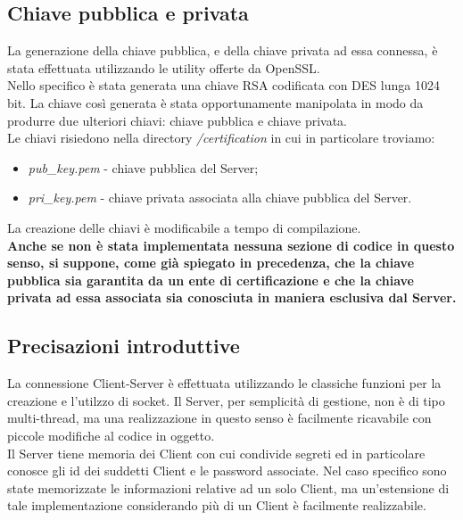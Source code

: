\documentclass[12pt, a4paper]{article}
\begin{document}
\subsection{Chiave pubblica e privata}
La generazione della chiave pubblica, e della chiave privata ad essa connessa, è stata effettuata utilizzando le utility offerte da OpenSSL.\\
Nello specifico è stata generata una chiave RSA codificata con DES lunga 1024 bit. La chiave così generata è stata opportunamente manipolata in modo da produrre due ulteriori chiavi: chiave pubblica e chiave privata.\\
Le chiavi risiedono nella directory \textit{/certification} in cui in particolare troviamo:
\begin{itemize}
\item 
\textit{pub\_key.pem} - chiave pubblica del Server;
\item
\textit{pri\_key.pem} - chiave privata associata alla chiave pubblica del Server.
\end{itemize}
La creazione delle chiavi è modificabile a tempo di compilazione.\\
\textbf{Anche se non è stata implementata nessuna sezione di codice in questo senso, si suppone, come già spiegato in precedenza, che la chiave pubblica sia garantita da un ente di certificazione e che la chiave privata ad essa associata sia conosciuta in maniera esclusiva dal Server.}
\subsection{Precisazioni introduttive}
La connessione Client-Server è effettuata utilizzando le classiche funzioni per la creazione e l'utilzzo di socket. Il Server, per semplicità di gestione, non è di tipo multi-thread, ma una realizzazione in questo senso è facilmente ricavabile con piccole modifiche al codice in oggetto.\\
Il Server tiene memoria dei Client con cui condivide segreti ed in particolare conosce gli id dei suddetti Client e le password associate. Nel caso specifico sono state memorizzate le informazioni relative ad un solo Client, ma un'estensione di tale implementazione considerando più di un Client è facilmente realizzabile.
\end{document}
